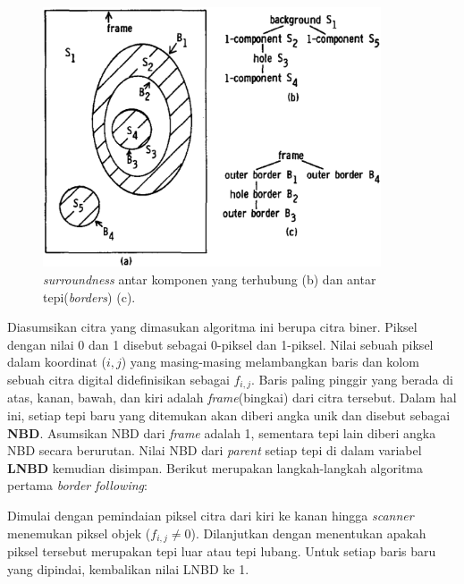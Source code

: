 \begin{figure}[H]
	\centering
	\includegraphics[keepaspectratio, width=10cm]{gambar/BorderFollowingPustaka/pic1.png}
	\caption{\textit{surroundness} antar komponen yang terhubung (b) 
	dan antar tepi(\textit{borders}) (c).}
	\label{gambar:Keliling_antar_komponen}
\end{figure}

Diasumsikan citra yang dimasukan algoritma ini 
berupa citra biner. Piksel dengan nilai 0 dan 1 
disebut sebagai 0-piksel dan 1-piksel. Nilai sebuah 
piksel dalam koordinat ($i,j$) yang masing-masing 
melambangkan baris dan kolom sebuah citra digital 
didefinisikan sebagai $f_{i,j}$. Baris paling pinggir
yang berada di atas, kanan, bawah, dan kiri adalah 
\textit{frame}(bingkai) dari citra tersebut. Dalam hal
ini, setiap tepi baru yang ditemukan akan diberi angka 
unik dan disebut sebagai \textbf{NBD}. Asumsikan NBD dari
\textit{frame} adalah 1, sementara tepi lain diberi angka 
NBD secara berurutan. Nilai NBD dari \textit{parent} 
setiap tepi di dalam variabel \textbf{LNBD} kemudian 
disimpan. Berikut merupakan langkah-langkah 
algoritma pertama \textit{border following}:

Dimulai dengan pemindaian piksel citra dari kiri ke kanan
hingga \textit{scanner} menemukan piksel objek 
($f_{i,j} \neq 0$). Dilanjutkan dengan menentukan 
apakah piksel tersebut merupakan tepi luar atau tepi 
lubang. Untuk setiap baris baru yang dipindai, 
kembalikan nilai LNBD ke 1.

